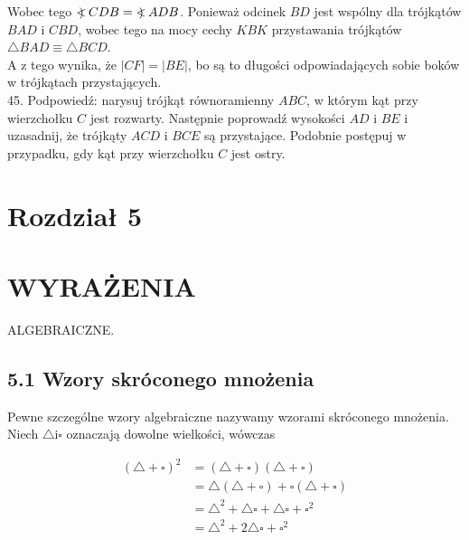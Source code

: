 \documentclass[10pt]{article}
\newcommand\Varangle{\mathop{{<\!\!\!\!\!\text{\small)}}\:}\nolimits}
\begin{document}
Wobec tego \(\Varangle C D B=\Varangle A D B\). Ponieważ odcinek \(B D\) jest wspólny dla trójkątów \(B A D\) i \(C B D\), wobec tego na mocy cechy \(K B K\) przystawania trójkątów \(\triangle B A D \equiv \triangle B C D\).\\
A z tego wynika, że \(|C F|=|B E|\), bo są to długości odpowiadających sobie boków w trójkątach przystających.\\
45. Podpowiedź: narysuj trójkąt równoramienny \(A B C\), w którym kąt przy wierzchołku \(C\) jest rozwarty. Następnie poprowadź wysokości \(A D\) i \(B E\) i uzasadnij, że trójkąty \(A C D\) i \(B C E\) są przystające. Podobnie postępuj w przypadku, gdy kąt przy wierzchołku \(C\) jest ostry.

\section*{Rozdział 5}
\section*{WYRAŻENIA}
ALGEBRAICZNE.

\subsection*{5.1 Wzory skróconego mnożenia}
Pewne szczególne wzory algebraiczne nazywamy wzorami skróconego mnożenia. Niech \(\triangle \mathrm{i} \square\) oznaczają dowolne wielkości, wówczas

\[
\begin{aligned}
(\triangle+\square)^{2} & =(\triangle+\square)(\triangle+\square) \\
& =\triangle(\triangle+\square)+\square(\triangle+\square) \\
& =\triangle^{2}+\triangle \square+\triangle \square+\square^{2} \\
& =\triangle^{2}+2 \triangle \square+\square^{2}
\end{aligned}
\]
\end{document}
